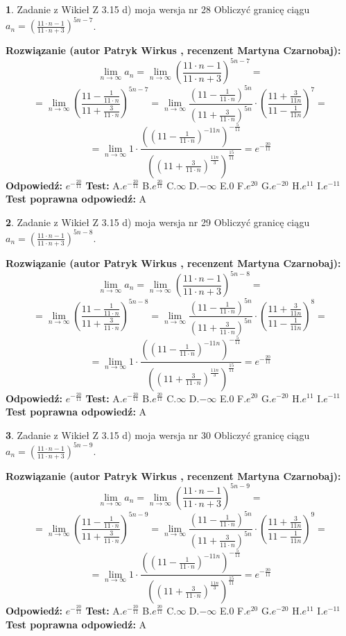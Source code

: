 \documentclass[12pt, a4paper]{article}
\theoremstyle{definition} %
\newtheorem{zad}{}
\newcommand{\zadStart}[1]{\begin{zad}#1\newline}
\newcommand{\zadStop}{\end{zad}}
\newcommand{\rozwStart}[2]{\noindent \textbf{Rozwiązanie (autor #1 , recenzent #2): }\newline}
\newcommand{\rozwStop}{\newline}
\newcommand{\odpStart}{\noindent \textbf{Odpowiedź:}\newline}
\newcommand{\odpStop}{\newline}
\newcommand{\testStart}{\noindent \textbf{Test:}\newline}
\newcommand{\testStop}{\newline}
\newcommand{\kluczStart}{\noindent \textbf{Test poprawna odpowiedź:}\newline}
\newcommand{\kluczStop}{\newline}
\begin{document}
\zadStart{Zadanie z Wikieł Z 3.15 d) moja wersja nr 28}
Obliczyć granicę ciągu $a_{n}=(\frac{11\cdot n - 1}{11 \cdot n + 3})^{5n-7}$.
\zadStop
\rozwStart{Patryk Wirkus}{Martyna Czarnobaj}
$$\lim\limits_{n\to\infty} a_{n} = \lim\limits_{n\to\infty}(\frac{11\cdot n - 1}{11 \cdot n + 3})^{5n-7}=$$
$$=\lim\limits_{n\to\infty}(\frac{11 - \frac{1}{11\cdot n}}{11 + \frac{3}{11 \cdot n}})^{5n-7}=\lim\limits_{n\to\infty}\frac{(11 - \frac{1}{11\cdot n})^{5n}}{(11 + \frac{3}{11\cdot n})^{5n}} \cdot (\frac{11+\frac{3}{11n}}{11-\frac{1}{11n}})^{7}=$$
$$=\lim\limits_{n\to\infty} 1 \cdot \frac{((11-\frac{1}{11 \cdot n})^{-11n})^{-\frac{5}{11}}}{((11+\frac{3}{11 \cdot n})^{\frac{11n}{3}})^{\frac{15}{11}}} =e^{-\frac{20}{11}}$$
\rozwStop
\odpStart
$e^{-\frac{20}{11}}$
\odpStop
\testStart
A.$ e^{-\frac{20}{11}}$
B.$ e^{\frac{20}{11}}$
C.$\infty$
D.$-\infty$
E.$0$
F.$e^{20}$
G.$e^{-20}$
H.$e^{11}$
I.$e^{-11}$
\testStop
\kluczStart
A
\kluczStop



\zadStart{Zadanie z Wikieł Z 3.15 d) moja wersja nr 29}
Obliczyć granicę ciągu $a_{n}=(\frac{11\cdot n - 1}{11 \cdot n + 3})^{5n-8}$.
\zadStop
\rozwStart{Patryk Wirkus}{Martyna Czarnobaj}
$$\lim\limits_{n\to\infty} a_{n} = \lim\limits_{n\to\infty}(\frac{11\cdot n - 1}{11 \cdot n + 3})^{5n-8}=$$
$$=\lim\limits_{n\to\infty}(\frac{11 - \frac{1}{11\cdot n}}{11 + \frac{3}{11 \cdot n}})^{5n-8}=\lim\limits_{n\to\infty}\frac{(11 - \frac{1}{11\cdot n})^{5n}}{(11 + \frac{3}{11\cdot n})^{5n}} \cdot (\frac{11+\frac{3}{11n}}{11-\frac{1}{11n}})^{8}=$$
$$=\lim\limits_{n\to\infty} 1 \cdot \frac{((11-\frac{1}{11 \cdot n})^{-11n})^{-\frac{5}{11}}}{((11+\frac{3}{11 \cdot n})^{\frac{11n}{3}})^{\frac{15}{11}}} =e^{-\frac{20}{11}}$$
\rozwStop
\odpStart
$e^{-\frac{20}{11}}$
\odpStop
\testStart
A.$ e^{-\frac{20}{11}}$
B.$ e^{\frac{20}{11}}$
C.$\infty$
D.$-\infty$
E.$0$
F.$e^{20}$
G.$e^{-20}$
H.$e^{11}$
I.$e^{-11}$
\testStop
\kluczStart
A
\kluczStop



\zadStart{Zadanie z Wikieł Z 3.15 d) moja wersja nr 30}
Obliczyć granicę ciągu $a_{n}=(\frac{11\cdot n - 1}{11 \cdot n + 3})^{5n-9}$.
\zadStop
\rozwStart{Patryk Wirkus}{Martyna Czarnobaj}
$$\lim\limits_{n\to\infty} a_{n} = \lim\limits_{n\to\infty}(\frac{11\cdot n - 1}{11 \cdot n + 3})^{5n-9}=$$
$$=\lim\limits_{n\to\infty}(\frac{11 - \frac{1}{11\cdot n}}{11 + \frac{3}{11 \cdot n}})^{5n-9}=\lim\limits_{n\to\infty}\frac{(11 - \frac{1}{11\cdot n})^{5n}}{(11 + \frac{3}{11\cdot n})^{5n}} \cdot (\frac{11+\frac{3}{11n}}{11-\frac{1}{11n}})^{9}=$$
$$=\lim\limits_{n\to\infty} 1 \cdot \frac{((11-\frac{1}{11 \cdot n})^{-11n})^{-\frac{5}{11}}}{((11+\frac{3}{11 \cdot n})^{\frac{11n}{3}})^{\frac{15}{11}}} =e^{-\frac{20}{11}}$$
\rozwStop
\odpStart
$e^{-\frac{20}{11}}$
\odpStop
\testStart
A.$ e^{-\frac{20}{11}}$
B.$ e^{\frac{20}{11}}$
C.$\infty$
D.$-\infty$
E.$0$
F.$e^{20}$
G.$e^{-20}$
H.$e^{11}$
I.$e^{-11}$
\testStop
\kluczStart
A
\kluczStop
\end{document}
